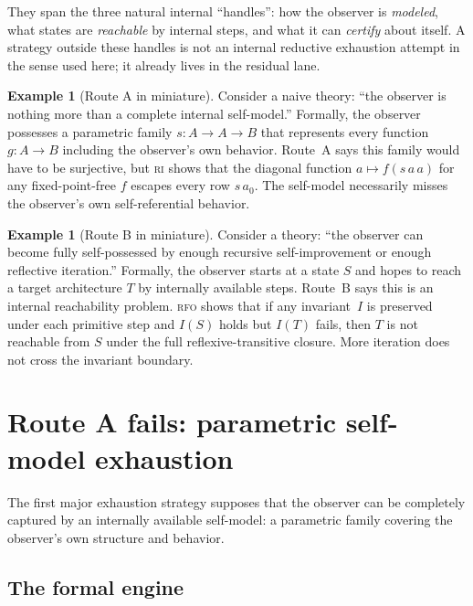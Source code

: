 \documentclass[11pt]{article}
\theoremstyle{plain}
\theoremstyle{definition}
\newtheorem{example}[theorem]{Example}
\theoremstyle{remark}
\newcommand{\RI}{\textsc{ri}}
\newcommand{\RFO}{\textsc{rfo}}
\begin{document}
\begin{keybox}[title={Why Routes A--C exhaust the reductive attack}]
They span the three natural internal ``handles'': how the observer is
\emph{modeled}, what states are \emph{reachable} by internal steps, and
what it can \emph{certify} about itself.  A strategy outside these handles
is not an internal reductive exhaustion attempt in the sense used here; it
already lives in the residual lane.
\end{keybox}

\begin{example}[Route A in miniature]
\label{ex:routeA}
Consider a naive theory: ``the observer is nothing more than a complete
internal self-model.''  Formally, the observer possesses a parametric
family $s : A \to A \to B$ that represents every function $g : A \to B$
including the observer's own behavior.  Route~A says this family would
have to be surjective, but \RI{} shows that the diagonal function
$a \mapsto f(s\,a\,a)$ for any fixed-point-free $f$ escapes every row
$s\,a_0$.  The self-model necessarily misses the observer's own
self-referential behavior.
\end{example}

\begin{example}[Route B in miniature]
\label{ex:routeB}
Consider a theory: ``the observer can become fully self-possessed by
enough recursive self-improvement or enough reflective iteration.''
Formally, the observer starts at a state $S$ and hopes to reach a target
architecture $T$ by internally available steps.  Route~B says this is an
internal reachability problem.  \RFO{} shows that if any invariant~$I$ is
preserved under each primitive step and $I(S)$ holds but $I(T)$ fails,
then $T$ is not reachable from $S$ under the full reflexive-transitive
closure.  More iteration does not cross the invariant boundary.
\end{example}

\section{Route A fails: parametric self-model exhaustion}
\label{sec:routeA}

The first major exhaustion strategy supposes that the observer can be
completely captured by an internally available self-model: a parametric
family covering the observer's own structure and behavior.

\subsection*{The formal engine}
\end{document}
